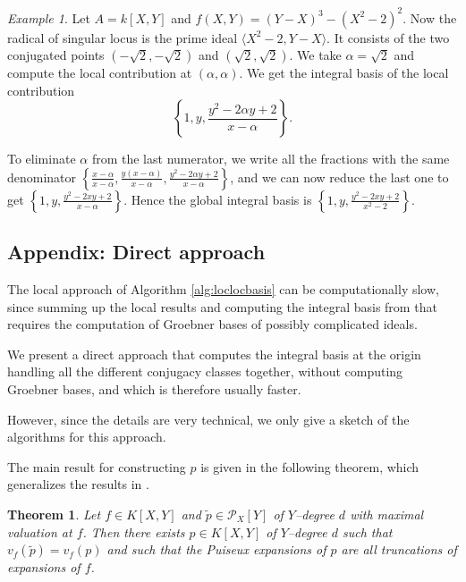 \documentclass[a4paper,11pt]{amsart}%
\theoremstyle{definition}
\theoremstyle{plain}
\newtheorem{theorem}[defn]{Theorem}
\theoremstyle{remark}
\newtheorem{example}[defn]{Example}
\begin{document}
\begin{example}
Let $A = k[X, Y]$ and $f(X, Y) = (Y-X)^{3} - (X^{2}-2)^{2}$. Now the radical
of singular locus is the prime ideal $\langle X^{2} - 2, Y-X \rangle$. It
consists of the two conjugated points $(-\sqrt{2}, -\sqrt{2})$ and $(\sqrt{2},
\sqrt{2})$. We take $\alpha= \sqrt{2}$ and compute the local contribution at
$(\alpha, \alpha)$. We get the integral basis of the local contribution
\[
\left\{  1, y, \frac{y^{2} - 2\alpha y + 2}{x-\alpha}\right\}  .
\]


To eliminate $\alpha$ from the last numerator, we write all the fractions with
the same denominator $\left\{  \frac{x-\alpha}{x-\alpha}, \frac{y(x-\alpha
)}{x-\alpha}, \frac{y^{2} - 2\alpha y + 2}{x-\alpha}\right\}  $, and we can
now reduce the last one to get $\left\{  1, y, \frac{y^{2} - 2x y +
2}{x-\alpha}\right\}  $. Hence the global integral basis is $\left\{  1, y,
\frac{y^{2} - 2x y + 2}{x^{2}-2}\right\}  $.
\end{example}

\subsection{Appendix: Direct approach}

\label{section:directApproach}


The local approach of Algorithm \ref{alg:loclocbasis} can be computationally
slow, since summing up the local results and computing the integral basis from
that requires the computation of Groebner bases of possibly complicated ideals.

We present a direct approach that computes the integral basis at the origin
handling all the different conjugacy classes together, without computing
Groebner bases, and which is therefore usually faster.

However, since the details are very technical, we only give a sketch of the
algorithms for this approach.

The main result for constructing $p$ is given in the following theorem, which
generalizes the results in \cite{vanHoeij94}.

\begin{theorem}
\label{thm:truncation} Let $f \in K[X,Y]$ and $\tilde p \in{\mathcal{P}_{X}%
}[Y]$ of $Y$--degree $d$ with maximal valuation at $f$. Then there exists $p
\in K[X,Y]$ of $Y$--degree $d$ such that $v_{f}(\tilde p) = v_{f}(p)$ and such
that the Puiseux expansions of $p$ are all truncations of expansions of $f$.
\end{theorem}
\end{document}
